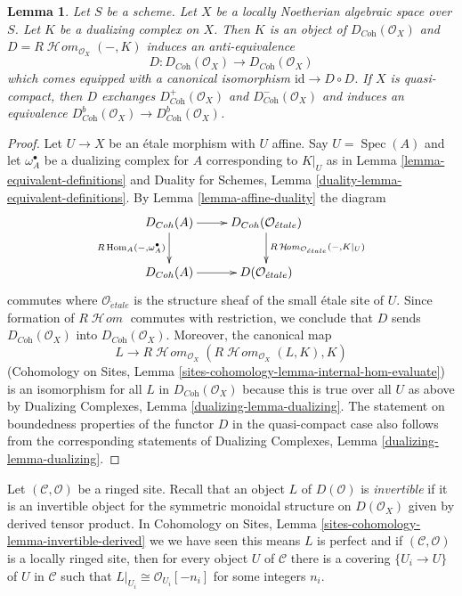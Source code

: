 \documentclass{stacks-project}
\theoremstyle{plain}
\newtheorem{lemma}[subsection]{Lemma}
\theoremstyle{definition}
\theoremstyle{remark}
\numberwithin{equation}{subsection}
\def\Spec{\mathop{\mathrm{Spec}}}
\def\Hom{\mathop{\mathrm{Hom}}\nolimits}
\def\SheafHom{\mathop{\mathcal{H}\!\mathit{om}}\nolimits}
\def\etale{{\acute{e}tale}}
\begin{document}
\begin{lemma}
\label{lemma-dualizing-spaces}
Let $S$ be a scheme. Let $X$ be a locally Noetherian algebraic space over $S$.
Let $K$ be a dualizing complex on $X$.
Then $K$ is an object of $D_{\textit{Coh}}(\mathcal{O}_X)$
and $D = R\SheafHom_{\mathcal{O}_X}(-, K)$ induces an anti-equivalence
$$
D :
D_{\textit{Coh}}(\mathcal{O}_X)
\longrightarrow
D_{\textit{Coh}}(\mathcal{O}_X)
$$
which comes equipped with a canonical isomorphism
$\text{id} \to D \circ D$. If $X$ is quasi-compact, then
$D$ exchanges $D^+_{\textit{Coh}}(\mathcal{O}_X)$ and
$D^-_{\textit{Coh}}(\mathcal{O}_X)$ and induces an equivalence
$D^b_{\textit{Coh}}(\mathcal{O}_X) \to D^b_{\textit{Coh}}(\mathcal{O}_X)$.
\end{lemma}

\begin{proof}
Let $U \to X$ be an \'etale morphism with $U$ affine. Say $U = \Spec(A)$ and
let $\omega_A^\bullet$ be a dualizing complex for $A$ corresponding to $K|_U$
as in Lemma \ref{lemma-equivalent-definitions} and
Duality for Schemes, Lemma \ref{duality-lemma-equivalent-definitions}.
By Lemma \ref{lemma-affine-duality} the diagram
$$
\xymatrix{
D_{\textit{Coh}}(A) \ar[r] \ar[d]_{R\Hom_A(-, \omega_A^\bullet)} &
D_{\textit{Coh}}(\mathcal{O}_\etale)
\ar[d]^{R\SheafHom_{\mathcal{O}_\etale}(-, K|_U)} \\
D_{\textit{Coh}}(A) \ar[r] &
D(\mathcal{O}_\etale)
}
$$
commutes where $\mathcal{O}_\etale$ is the structure sheaf of the
small \'etale site of $U$. Since formation of $R\SheafHom$ commutes
with restriction, we conclude that $D$ sends
$D_{\textit{Coh}}(\mathcal{O}_X)$ into
$D_{\textit{Coh}}(\mathcal{O}_X)$. Moreover, the canonical map
$$
L \longrightarrow
R\SheafHom_{\mathcal{O}_X}(R\SheafHom_{\mathcal{O}_X}(L, K), K)
$$
(Cohomology on Sites, Lemma \ref{sites-cohomology-lemma-internal-hom-evaluate})
is an isomorphism for all $L$ in $D_{\textit{Coh}}(\mathcal{O}_X)$
because this is true over all $U$ as above by
Dualizing Complexes, Lemma \ref{dualizing-lemma-dualizing}.
The statement on boundedness properties of the functor $D$
in the quasi-compact case also follows from the corresponding
statements of Dualizing Complexes, Lemma \ref{dualizing-lemma-dualizing}.
\end{proof}

\noindent
Let $(\mathcal{C}, \mathcal{O})$ be a ringed site. Recall
that an object $L$ of $D(\mathcal{O})$ is {\it invertible}
if it is an invertible object for the symmetric monoidal
structure on $D(\mathcal{O}_X)$ given by derived tensor product. In
Cohomology on Sites, Lemma \ref{sites-cohomology-lemma-invertible-derived}
we we have seen this means $L$ is perfect and if $(\mathcal{C}, \mathcal{O})$
is a locally ringed site, then for every object $U$ of $\mathcal{C}$
there is a covering $\{U_i \to U\}$ of $U$ in $\mathcal{C}$
such that $L|_{U_i} \cong \mathcal{O}_{U_i}[-n_i]$
for some integers $n_i$.
\end{document}
